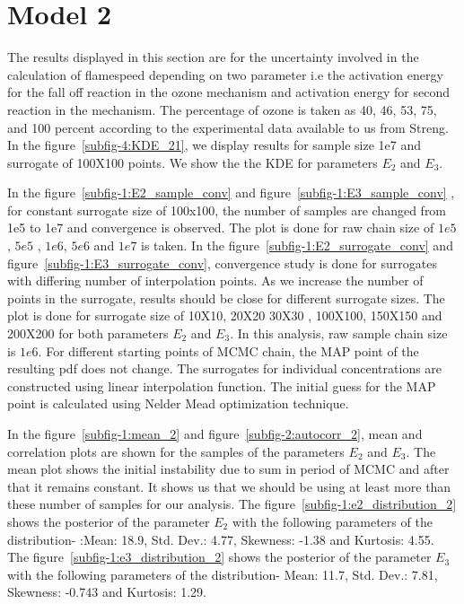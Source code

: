 \section{Model 2}

The results displayed in this section are for the uncertainty involved in the calculation of flamespeed depending  on two parameter i.e the activation energy for the fall off reaction in the ozone mechanism and activation energy for second reaction in the mechanism. The percentage of ozone is taken as 40, 46, 53, 75, and 100  percent according to the experimental data available to us from Streng\cite{Streng}. In the
figure~\ref{subfig-4:KDE_21},  we display results for sample size 1e7 and surrogate
of 100X100 points.  We show the the KDE for parameters $E_2$ and $E_3$.

\bigskip

In the figure~\ref{subfig-1:E2_sample_conv} and figure~\ref{subfig-1:E3_sample_conv} , for
constant surrogate size of 100x100, the number of samples are changed from 1e5 to
1e7 and convergence is observed. The plot is done for raw chain size of $1e5$, $5e5$ , $1e6$, $5e6$ and $1e7$ is taken. In the figure~\ref{subfig-1:E2_surrogate_conv} and figure~\ref{subfig-1:E3_surrogate_conv},
convergence study is done for surrogates with differing number of interpolation points. As we increase the number of points in the surrogate, results should be close for different surrogate sizes. The plot is done for surrogate size of 10X10, 20X20 30X30 , 100X100, 150X150 and 200X200 for both parameters $E_2$ and $E_3$. In this analysis, raw sample chain size is $1e6$. For different starting points of MCMC chain, the MAP point of the resulting pdf does not change. The surrogates for individual concentrations are constructed using linear interpolation
function. The initial guess for the MAP point is calculated using Nelder Mead optimization technique. 


\bigskip

In the
figure~\ref{subfig-1:mean_2} and figure~\ref{subfig-2:autocorr_2},  mean and correlation plots are shown for
the samples of the parameters $E_2$ and $E_3$. The mean plot shows the initial instability due to sum in period of MCMC and after that it remains constant. It shows us that we should be using at least more than these number of samples for our analysis. The figure~\ref{subfig-1:e2_distribution_2} shows the posterior of the parameter $E_2$ with the following parameters of the distribution- :Mean:  18.9, Std. Dev.:  4.77, Skewness:  -1.38 and Kurtosis:  4.55.  The figure~\ref{subfig-1:e3_distribution_2} shows the posterior of the parameter $E_3$ with the following parameters of the distribution- Mean:  11.7, Std. Dev.: 7.81, Skewness:  -0.743 and Kurtosis:  1.29.


